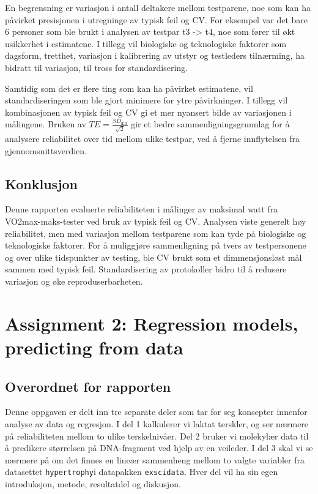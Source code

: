 \documentclass[
  letterpaper,
  DIV=11,
  numbers=noendperiod]{scrreprt}
\begin{document}
En begrensning er variasjon i antall deltakere mellom testparene, noe
som kan ha påvirket presisjonen i utregninge av typisk feil og CV. For
eksempel var det bare 6 personer som ble brukt i analysen av testpar t3
-\textgreater{} t4, noe som fører til økt usikkerhet i estimatene. I
tillegg vil biologiske og teknologiske faktorer som dagsform, tretthet,
variasjon i kalibrering av utstyr og testleders tilnærming, ha bidratt
til variasjon, til tross for standardisering.

Samtidig som det er flere ting som kan ha påvirket estimatene, vil
standardiseringen som ble gjort minimere for ytre påvirkninger. I
tillegg vil kombinasjonen av typisk feil og CV gi et mer nyansert bilde
av variasjonen i målingene. Bruken av
\(TE = \frac{SD_{\text{diff}}}{\sqrt{2}}\) gir et bedre
sammenligningsgrunnlag for å analysere reliabilitet over tid mellom
ulike testpar, ved å fjerne innflytelsen fra gjennomsnittsverdien.

\section{Konklusjon}\label{konklusjon}

Denne rapporten evaluerte reliabiliteten i målinger av maksimal watt fra
VO2max-maks-tester ved bruk av typisk feil og CV. Analysen viste
generelt høy reliabilitet, men med variasjon mellom testparene som kan
tyde på biologiske og teknologiske faktorer. For å muliggjøre
sammenligning på tvers av testpersonene og over ulike tidspunkter av
testing, ble CV brukt som et dimmensjonsløst mål sammen med typisk feil.
Standardisering av protokoller bidro til å redusere variasjon og øke
reproduserbarheten.


\chapter{Assignment 2: Regression models, predicting from
data}\label{assignment-2-regression-models-predicting-from-data}

\section{Overordnet for rapporten}\label{overordnet-for-rapporten}

Denne oppgaven er delt inn tre separate deler som tar for seg konsepter
innenfor analyse av data og regresjon. I del 1 kalkulerer vi laktat
terskler, og ser nærmere på reliabiliteten mellom to ulike
terskelnivåer. Del 2 bruker vi molekylær data til å predikere størrelsen
på DNA-fragment ved hjelp av en veileder. I del 3 skal vi se nærmere på
om det finnes en lineær sammenheng mellom to valgte variabler fra
datasettet \texttt{hypertrophy}i datapakken \texttt{exscidata}. Hver del
vil ha sin egen introduksjon, metode, resultatdel og diskusjon.
\end{document}
